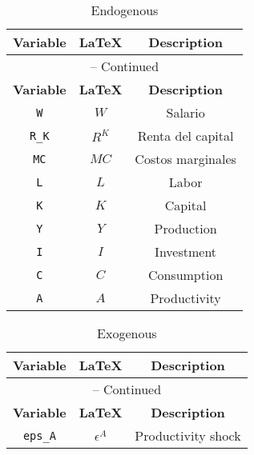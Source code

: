 \begin{center}
\begin{longtable}{ccc}
\caption{Endogenous}\\%
\hline%
\multicolumn{1}{c}{\textbf{Variable}} &
\multicolumn{1}{c}{\textbf{\LaTeX}} &
\multicolumn{1}{c}{\textbf{Description}}\\%
\hline\hline%
\endfirsthead
\multicolumn{3}{c}{{\tablename} \thetable{} -- Continued}\\%
\hline%
\multicolumn{1}{c}{\textbf{Variable}} &
\multicolumn{1}{c}{\textbf{\LaTeX}} &
\multicolumn{1}{c}{\textbf{Description}}\\%
\hline\hline%
\endhead
\texttt{W} & $W$ & Salario\\
\texttt{R\_K} & $R^{K}$ & Renta del capital\\
\texttt{MC} & $MC$ & Costos marginales\\
\texttt{L} & $L$ & Labor\\
\texttt{K} & $K$ & Capital\\
\texttt{Y} & $Y$ & Production\\
\texttt{I} & $I$ & Investment\\
\texttt{C} & $C$ & Consumption\\
\texttt{A} & $A$ & Productivity\\
\hline%
\end{longtable}
\end{center}
\begin{center}
\begin{longtable}{ccc}
\caption{Exogenous}\\%
\hline%
\multicolumn{1}{c}{\textbf{Variable}} &
\multicolumn{1}{c}{\textbf{\LaTeX}} &
\multicolumn{1}{c}{\textbf{Description}}\\%
\hline\hline%
\endfirsthead
\multicolumn{3}{c}{{\tablename} \thetable{} -- Continued}\\%
\hline%
\multicolumn{1}{c}{\textbf{Variable}} &
\multicolumn{1}{c}{\textbf{\LaTeX}} &
\multicolumn{1}{c}{\textbf{Description}}\\%
\hline\hline%
\endhead
\texttt{eps\_A} & $\epsilon^{A}$ & Productivity shock\\
\hline%
\end{longtable}
\end{center}
